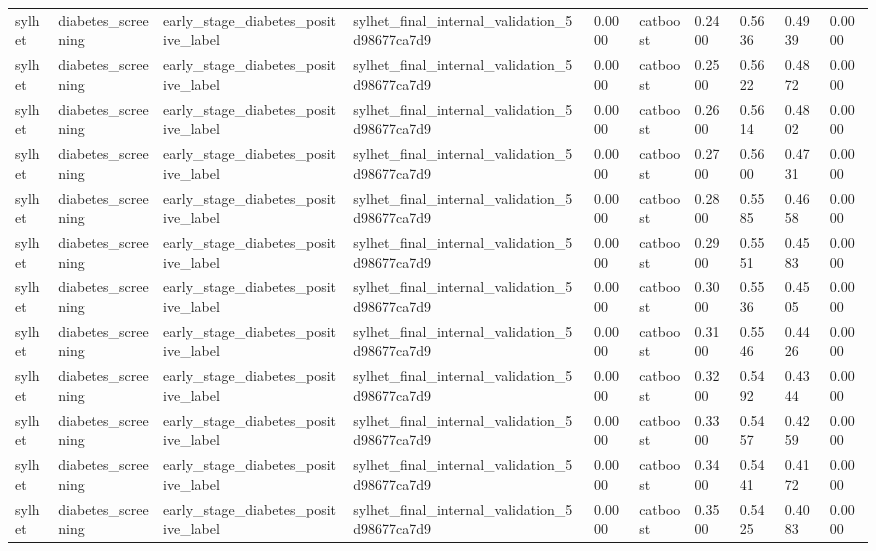 \begin{tabular}{llllllllll}
sylhet & diabetes\_screening & early\_stage\_diabetes\_positive\_label & sylhet\_final\_internal\_validation\_5d98677ca7d9 & 0.0000 & catboost & 0.2400 & 0.5636 & 0.4939 & 0.0000 \\
sylhet & diabetes\_screening & early\_stage\_diabetes\_positive\_label & sylhet\_final\_internal\_validation\_5d98677ca7d9 & 0.0000 & catboost & 0.2500 & 0.5622 & 0.4872 & 0.0000 \\
sylhet & diabetes\_screening & early\_stage\_diabetes\_positive\_label & sylhet\_final\_internal\_validation\_5d98677ca7d9 & 0.0000 & catboost & 0.2600 & 0.5614 & 0.4802 & 0.0000 \\
sylhet & diabetes\_screening & early\_stage\_diabetes\_positive\_label & sylhet\_final\_internal\_validation\_5d98677ca7d9 & 0.0000 & catboost & 0.2700 & 0.5600 & 0.4731 & 0.0000 \\
sylhet & diabetes\_screening & early\_stage\_diabetes\_positive\_label & sylhet\_final\_internal\_validation\_5d98677ca7d9 & 0.0000 & catboost & 0.2800 & 0.5585 & 0.4658 & 0.0000 \\
sylhet & diabetes\_screening & early\_stage\_diabetes\_positive\_label & sylhet\_final\_internal\_validation\_5d98677ca7d9 & 0.0000 & catboost & 0.2900 & 0.5551 & 0.4583 & 0.0000 \\
sylhet & diabetes\_screening & early\_stage\_diabetes\_positive\_label & sylhet\_final\_internal\_validation\_5d98677ca7d9 & 0.0000 & catboost & 0.3000 & 0.5536 & 0.4505 & 0.0000 \\
sylhet & diabetes\_screening & early\_stage\_diabetes\_positive\_label & sylhet\_final\_internal\_validation\_5d98677ca7d9 & 0.0000 & catboost & 0.3100 & 0.5546 & 0.4426 & 0.0000 \\
sylhet & diabetes\_screening & early\_stage\_diabetes\_positive\_label & sylhet\_final\_internal\_validation\_5d98677ca7d9 & 0.0000 & catboost & 0.3200 & 0.5492 & 0.4344 & 0.0000 \\
sylhet & diabetes\_screening & early\_stage\_diabetes\_positive\_label & sylhet\_final\_internal\_validation\_5d98677ca7d9 & 0.0000 & catboost & 0.3300 & 0.5457 & 0.4259 & 0.0000 \\
sylhet & diabetes\_screening & early\_stage\_diabetes\_positive\_label & sylhet\_final\_internal\_validation\_5d98677ca7d9 & 0.0000 & catboost & 0.3400 & 0.5441 & 0.4172 & 0.0000 \\
sylhet & diabetes\_screening & early\_stage\_diabetes\_positive\_label & sylhet\_final\_internal\_validation\_5d98677ca7d9 & 0.0000 & catboost & 0.3500 & 0.5425 & 0.4083 & 0.0000 \\

\end{tabular}
